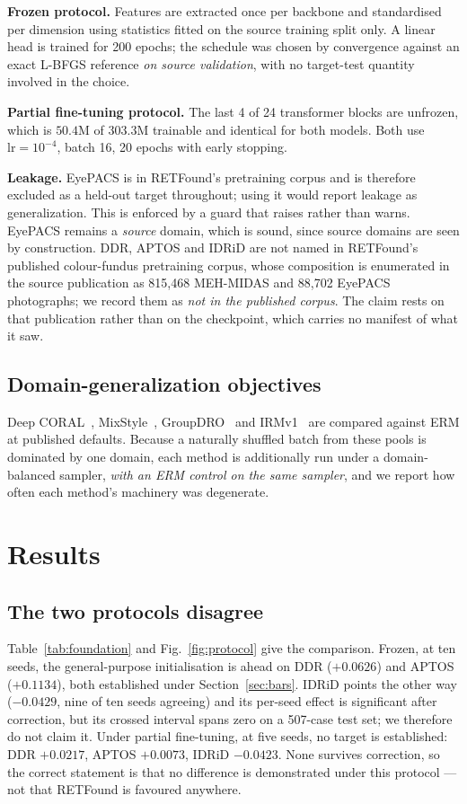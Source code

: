 \documentclass[journal]{IEEEtran}
\begin{document}
\textbf{Frozen protocol.} Features are extracted once per backbone and
standardised per dimension using statistics fitted on the source training split
only. A linear head is trained for 200 epochs; the schedule was chosen by
convergence against an exact L-BFGS reference \emph{on source validation}, with
no target-test quantity involved in the choice.

\textbf{Partial fine-tuning protocol.} The last 4 of 24 transformer blocks are unfrozen,
which is $50.4$M of $303.3$M trainable and identical for both models. Both use
$\mathrm{lr}=10^{-4}$, batch 16, 20 epochs with early stopping.

\textbf{Leakage.} EyePACS is in RETFound's pretraining corpus and is therefore
excluded as a held-out target throughout; using it would report leakage as
generalization. This is enforced by a guard that raises rather than warns.
EyePACS remains a \emph{source} domain, which is sound, since source domains are
seen by construction. DDR, APTOS and IDRiD are not named in RETFound's
published colour-fundus pretraining corpus, whose composition is enumerated
in the source publication as 815{,}468 MEH-MIDAS and 88{,}702 EyePACS
photographs; we record them as \emph{not in the published corpus}. The
claim rests on that publication rather than on the checkpoint, which carries
no manifest of what it saw.

\subsection{Domain-generalization objectives}
Deep CORAL~\cite{sun2016deepcoral}, MixStyle~\cite{zhou2021mixstyle},
GroupDRO~\cite{sagawa2020groupdro} and IRMv1~\cite{arjovsky2019irm} are compared
against ERM at published defaults. Because a naturally shuffled batch from these
pools is dominated by one domain, each method is additionally run under a
domain-balanced sampler, \emph{with an ERM control on the same sampler}, and we
report how often each method's machinery was degenerate.

\section{Results}

\subsection{The two protocols disagree}
\label{sec:protocol}
Table~\ref{tab:foundation} and Fig.~\ref{fig:protocol} give the comparison.
Frozen, at ten seeds, the general-purpose initialisation is ahead on DDR
($+0.0626$) and APTOS ($+0.1134$), both established under
Section~\ref{sec:bars}. IDRiD points the other way ($-0.0429$, nine of ten
seeds agreeing) and its per-seed effect is significant after correction, but
its crossed interval spans zero on a 507-case test set; we therefore do not
claim it. Under partial fine-tuning, at five seeds, no target is established:
DDR $+0.0217$, APTOS $+0.0073$, IDRiD $-0.0423$. None survives correction, so
the correct statement is that no difference is demonstrated under this
protocol --- not that RETFound is favoured anywhere.
\end{document}
